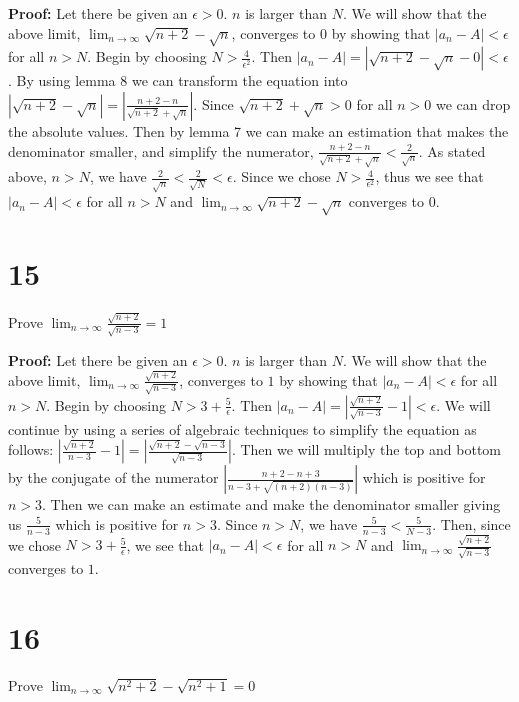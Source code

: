 \documentclass[12pt]{article}
\begin{document}
\bigskip

\textbf{Proof:} Let there be given an $\epsilon > 0$. $n$ is larger than $N$. We will show that the above limit, $\lim_{n\to \infty} \sqrt{n+2} - \sqrt{n}$, converges to $0$ by showing that $|a_n - A| < \epsilon$ for all $n > N$. Begin by choosing $N > \frac{4}{\epsilon^2}$. Then $|a_n - A| = | \sqrt{n+2} - \sqrt{n} - 0 | < \epsilon$. By using lemma 8 we can transform the equation into $| \sqrt{n+2} - \sqrt{n} | = |\frac{n + 2 - n}{\sqrt{n + 2} + {\sqrt{n}}}|$. Since $\sqrt{n+2}+\sqrt{n} > 0$ for all $n>0$ we can drop the absolute values. Then by lemma 7 we can make an estimation that makes the denominator smaller, and simplify the numerator, $\frac{n + 2 - n}{\sqrt{n + 2} + {\sqrt{n}}} < \frac{2}{\sqrt{n}}$. As stated above, $n > N$, we have $\frac{2}{\sqrt{n}} < \frac{2}{\sqrt{N}} < \epsilon$. Since we chose $N > \frac{4}{\epsilon^2}$, thus we see that $|a_n - A| < \epsilon$ for all $n > N$ and $\lim_{n\to \infty} \sqrt{n+2} - \sqrt{n}$ converges to $0$.

\section*{15}
Prove $\lim_{n\to \infty}\frac{\sqrt{n+2}}{\sqrt{n-3}} = 1$

\bigskip

\textbf{Proof:} Let there be given an $\epsilon > 0$. $n$ is larger than $N$. We will show that the above limit, $\lim_{n\to \infty}\frac{\sqrt{n+2}}{\sqrt{n-3}}$, converges to $1$ by showing that $|a_n - A| < \epsilon$ for all $n > N$. Begin by choosing $N > 3 + \frac{5}{\epsilon}$. Then $|a_n - A| = | \frac{\sqrt{n+2}}{\sqrt{n-3}} - 1 | < \epsilon$. We will continue by using a series of algebraic techniques to simplify the equation as follows: $|\frac{\sqrt{n+2}}{n-3} - 1| = |\frac{\sqrt{n+2}-\sqrt{n-3}}{\sqrt{n-3}}|$. Then we will multiply the top and bottom by the conjugate of the numerator $|\frac{n+2-n+3}{n-3+\sqrt{(n+2)(n-3)}}|$ which is positive for $n>3$. Then we can make an estimate and make the denominator smaller giving us $\frac{5}{n-3}$ which is positive for $n>3$. Since $n > N$, we have $\frac{5}{n-3} < \frac{5}{N-3}$. Then, since we chose $N > 3 + \frac{5}{\epsilon}$, we see that $|a_n - A| < \epsilon$ for all $n > N$ and $\lim_{n\to \infty}\frac{\sqrt{n+2}}{\sqrt{n-3}}$ converges to $1$.

\bigskip

\section*{16}
Prove $\lim_{n\to \infty}\sqrt{n^2+2}-\sqrt{n^2+1} = 0$
\end{document}
